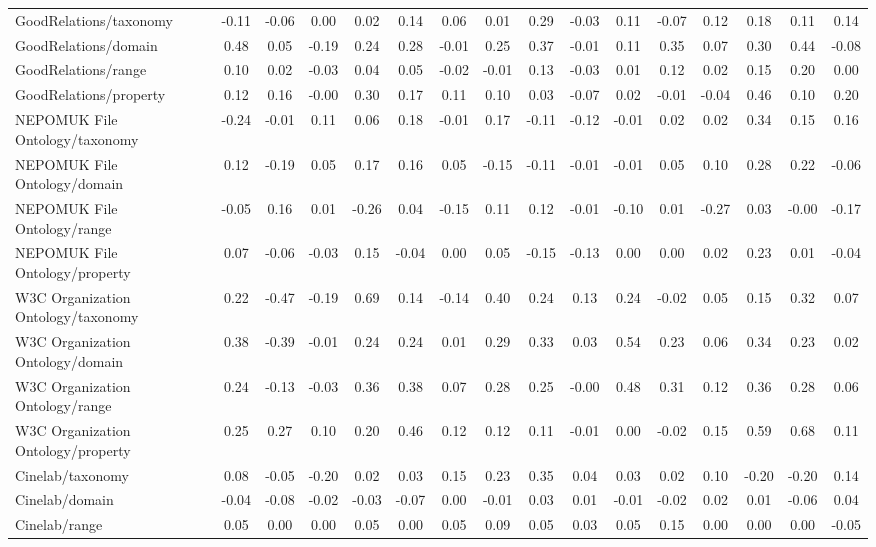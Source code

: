 \begin{tabular}{lccccccccccccccc}
GoodRelations/taxonomy & -0.11 & -0.06 & 0.00 & 0.02 & 0.14 & 0.06 & 0.01 & 0.29 & -0.03 & 0.11 & -0.07 & 0.12 & 0.18 & 0.11 & 0.14 \\
GoodRelations/domain & 0.48 & 0.05 & -0.19 & 0.24 & 0.28 & -0.01 & 0.25 & 0.37 & -0.01 & 0.11 & 0.35 & 0.07 & 0.30 & 0.44 & -0.08 \\
GoodRelations/range & 0.10 & 0.02 & -0.03 & 0.04 & 0.05 & -0.02 & -0.01 & 0.13 & -0.03 & 0.01 & 0.12 & 0.02 & 0.15 & 0.20 & 0.00 \\
GoodRelations/property & 0.12 & 0.16 & -0.00 & 0.30 & 0.17 & 0.11 & 0.10 & 0.03 & -0.07 & 0.02 & -0.01 & -0.04 & 0.46 & 0.10 & 0.20 \\
NEPOMUK File Ontology/taxonomy & -0.24 & -0.01 & 0.11 & 0.06 & 0.18 & -0.01 & 0.17 & -0.11 & -0.12 & -0.01 & 0.02 & 0.02 & 0.34 & 0.15 & 0.16 \\
NEPOMUK File Ontology/domain & 0.12 & -0.19 & 0.05 & 0.17 & 0.16 & 0.05 & -0.15 & -0.11 & -0.01 & -0.01 & 0.05 & 0.10 & 0.28 & 0.22 & -0.06 \\
NEPOMUK File Ontology/range & -0.05 & 0.16 & 0.01 & -0.26 & 0.04 & -0.15 & 0.11 & 0.12 & -0.01 & -0.10 & 0.01 & -0.27 & 0.03 & -0.00 & -0.17 \\
NEPOMUK File Ontology/property & 0.07 & -0.06 & -0.03 & 0.15 & -0.04 & 0.00 & 0.05 & -0.15 & -0.13 & 0.00 & 0.00 & 0.02 & 0.23 & 0.01 & -0.04 \\
W3C Organization Ontology/taxonomy & 0.22 & -0.47 & -0.19 & 0.69 & 0.14 & -0.14 & 0.40 & 0.24 & 0.13 & 0.24 & -0.02 & 0.05 & 0.15 & 0.32 & 0.07 \\
W3C Organization Ontology/domain & 0.38 & -0.39 & -0.01 & 0.24 & 0.24 & 0.01 & 0.29 & 0.33 & 0.03 & 0.54 & 0.23 & 0.06 & 0.34 & 0.23 & 0.02 \\
W3C Organization Ontology/range & 0.24 & -0.13 & -0.03 & 0.36 & 0.38 & 0.07 & 0.28 & 0.25 & -0.00 & 0.48 & 0.31 & 0.12 & 0.36 & 0.28 & 0.06 \\
W3C Organization Ontology/property & 0.25 & 0.27 & 0.10 & 0.20 & 0.46 & 0.12 & 0.12 & 0.11 & -0.01 & 0.00 & -0.02 & 0.15 & 0.59 & 0.68 & 0.11 \\
Cinelab/taxonomy & 0.08 & -0.05 & -0.20 & 0.02 & 0.03 & 0.15 & 0.23 & 0.35 & 0.04 & 0.03 & 0.02 & 0.10 & -0.20 & -0.20 & 0.14 \\
Cinelab/domain & -0.04 & -0.08 & -0.02 & -0.03 & -0.07 & 0.00 & -0.01 & 0.03 & 0.01 & -0.01 & -0.02 & 0.02 & 0.01 & -0.06 & 0.04 \\
Cinelab/range & 0.05 & 0.00 & 0.00 & 0.05 & 0.00 & 0.05 & 0.09 & 0.05 & 0.03 & 0.05 & 0.15 & 0.00 & 0.00 & 0.00 & -0.05 \\

\end{tabular}
